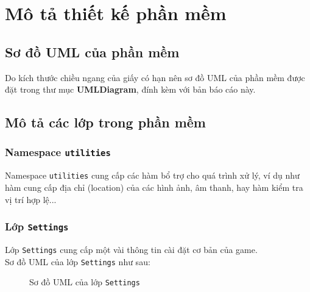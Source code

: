 \section{Mô tả thiết kế phần mềm}
\subsection{Sơ đồ UML của phần mềm}
Do kích thước chiều ngang của giấy có hạn nên sơ đồ UML của phần mềm được đặt trong thư mục \textbf{UMLDiagram}, đính kèm với bản báo cáo này.

\subsection{Mô tả các lớp trong phần mềm}
\subsubsection{Namespace \lstinline{utilities}}
Namespace \lstinline{utilities} cung cấp các hàm bổ trợ cho quá trình xử lý, ví dụ như hàm cung cấp địa chỉ (location) của các hình ảnh, âm thanh, hay hàm kiểm tra vị trí hợp lệ...

\subsubsection{Lớp \lstinline{Settings}}
Lớp \lstinline{Settings} cung cấp một vài thông tin cài đặt cơ bản của game.\\
Sơ đồ UML của lớp \lstinline{Settings} như sau:

\begin{figure}[H]
\caption{Sơ đồ UML của lớp \lstinline{Settings}}
\end{figure} 

